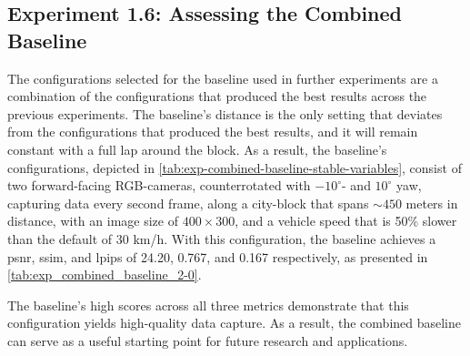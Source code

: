 \subsection{Experiment 1.6: Assessing the Combined Baseline} \label{sec:exp-combined-baseline}
The configurations selected for the baseline used in further experiments are a combination of the configurations that produced the best results across the previous experiments. The baseline’s distance is the only setting that deviates from the configurations that produced the best results, and it will remain constant with a full lap around the block. As a result, the baseline's configurations, depicted in \autoref{tab:exp-combined-baseline-stable-variables}, consist of two forward-facing RGB-cameras, counterrotated with $-10^\circ$- and $10^\circ$ yaw, capturing data every second frame, along a city-block that spans $\sim450$ meters in distance, with an image size of $400 \times 300$, and a vehicle speed that is 50\% slower than the default of 30 km/h. With this configuration, the baseline achieves a \acrshort{psnr}, \acrshort{ssim}, and \acrshort{lpips} of 24.20, 0.767, and 0.167 respectively, as presented in \autoref{tab:exp_combined_baseline_2-0}.

The baseline's high scores across all three metrics demonstrate that this configuration yields high-quality data capture. As a result, the combined baseline can serve as a useful starting point for future research and applications.


